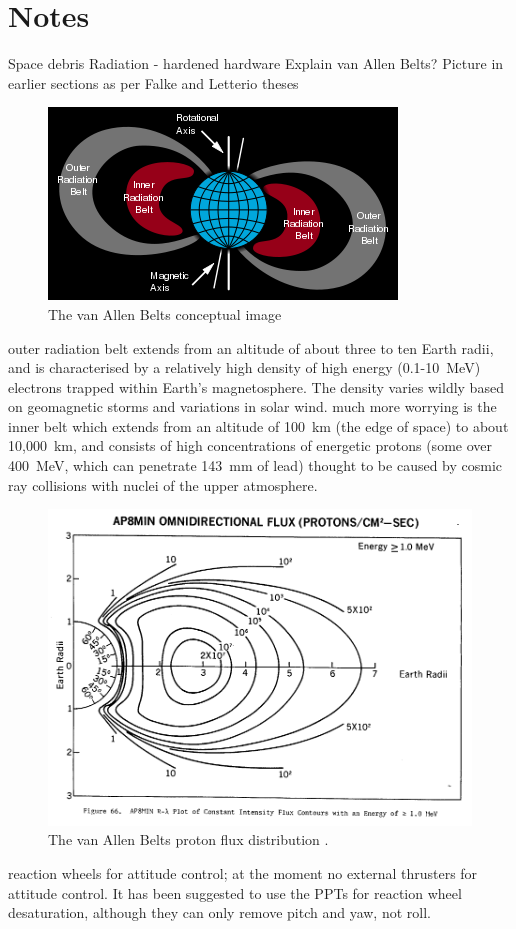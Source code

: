 \part{Notes}

Space debris
Radiation - hardened hardware
Explain van Allen Belts? Picture in earlier sections as per Falke and Letterio theses
\begin{figure} \label{fig:vabs}
\includegraphics[width=\textwidth]{Images/350px-Van_Allen_radiation_belt_svg.png}
\caption{The van Allen Belts conceptual image}
\end{figure}
outer radiation belt extends from an altitude of about three to ten Earth radii, and is characterised by a relatively high density of high energy (0.1-10~MeV) electrons trapped within Earth's magnetosphere. The density varies wildly based on geomagnetic storms and variations in solar wind.
much more worrying is the inner belt which extends from an altitude of 100~km (the edge of space) to about 10,000~km, and consists of high concentrations of energetic protons (some over 400~MeV, which can penetrate 143~mm of lead) thought to be caused by cosmic ray collisions with nuclei of the upper atmosphere.
\begin{figure} \label{fig:vabs2}
\includegraphics[width=\textwidth]{Images/Ap8-omni-1_000MeV.png}
\caption{The van Allen Belts proton flux distribution \parencite{Sawyer1976}.}
\end{figure}
reaction wheels for attitude control; at the moment no external thrusters for attitude control. It has been suggested to use the PPTs for reaction wheel desaturation, although they can only remove pitch and yaw, not roll.


